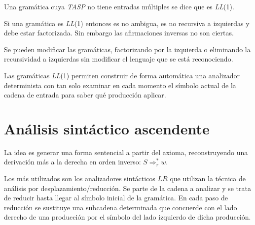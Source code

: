 Una gramática cuya \textit{TASP} no tiene entradas múltiples se dice que es \textit{LL}(1).

Si una gramática es \textit{LL}(1) entonces es no ambigua, es no recursiva a izquierdas y debe estar factorizada. Sin embargo las  afirmaciones inversas no son ciertas.

Se pueden modificar las gramáticas, factorizando por la izquierda o eliminando la recursividad a izquierdas sin modificar el lenguaje que se está reconociendo.



Las gramáticas \textit{LL}(1) permiten construir de forma automática una analizador determinista con tan solo examinar en cada momento el símbolo actual de la cadena de entrada para saber qué producción aplicar. 

%	
	

\section{Análisis sintáctico ascendente}


La idea es generar una forma sentencial a partir del axioma, reconstruyendo una derivación más a la derecha en orden inverso:  $S\Rightarrow_{r}^{*}w$.

Los más utilizados son los  analizadores sintácticos $LR$ que utilizan la técnica de análisis por desplazamiento/reducción. Se parte de la cadena a analizar y se trata de reducir hasta llegar al símbolo inicial de la gramática.
En cada paso de reducción se sustituye una subcadena determinada que concuerde con el lado derecho de una producción por el símbolo del lado izquierdo de dicha producción.

